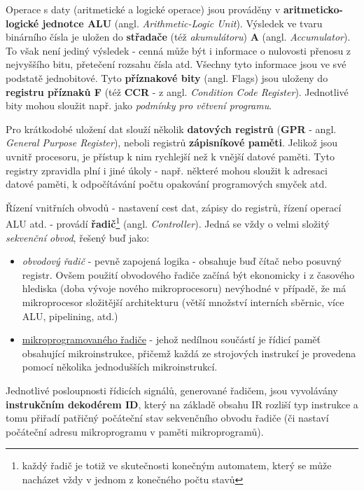     Operace s daty (aritmetické a logické operace) jsou prováděny v \textbf{aritmeticko-logické 
    jednotce ALU} (angl. \emph{Arithmetic-Logic Unit}). Výsledek ve tvaru binárního čísla je uložen 
    do \textbf{střadače} (též \emph{akumulátoru}) \textbf{A} (angl. \emph{Accumulator}). To však 
    není jediný výsledek - cenná může být i informace o nulovosti přenosu z nejvyššího bitu, 
    přetečení rozsahu čísla atd. Všechny tyto informace jsou ve své podstatě jednobitové. Tyto 
    \textbf{příznakové bity} (angl. Flags) jsou uloženy do \textbf{registru příznaků F} (též 
    \textbf{CCR} - z angl. \emph{Condition Code Register}). Jednotlivé bity mohou sloužit např. 
    jako \emph{podmínky pro větvení programu}.
    
    Pro krátkodobé uložení dat slouží několik \textbf{datových registrů} (\textbf{GPR} - angl. 
    \emph{General Purpose Register}), neboli registrů \textbf{zápisníkové paměti}. Jelikož jsou 
    uvnitř procesoru, je přístup k nim rychlejší než k vnější datové paměti. Tyto registry 
    zpravidla plní i jiné úkoly - např. některé mohou sloužit k adresaci datové paměti, k 
    odpočítávání počtu opakování programových smyček atd.
    
    Řízení vnitřních obvodů - nastavení cest dat, zápisy do registrů, řízení operací ALU atd. - 
    provádí \textbf{řadič}\footnote{každý řadič je totiž ve skutečnosti konečným automatem, který 
    se může nacházet vždy v jednom z konečného počtu stavů} (angl. \emph{Controller}). Jedná se 
    vždy o velmi složitý \emph{sekvenční 
    obvod}, řešený buď jako:
    \begin{itemize}\addtolength{\itemsep}{-0.5\baselineskip}
      \item \emph{obvodový řadič} - pevně zapojená logika - obsahuje buď čítač nebo posuvný 
           registr. Ovšem použití obvodového řadiče začíná být ekonomicky i z časového hlediska 
           (doba vývoje nového mikroprocesoru) nevýhodné v případě, že má mikroprocesor složitější 
           architekturu  (větší množství interních sběrnic, více ALU, pipelining, atd.)
      \item \hyperlink{ces:IchapIVsecIIssecI}{mikroprogramo­vaného řadiče} - jehož nedílnou 
      součástí je 
             řídicí paměť obsahující 
             mikroinstrukce, přičemž každá ze strojových instrukcí je provedena pomocí několika 
            jednodušších mikroinstrukcí.
    \end{itemize} 
   
    Jednotlivé posloupnosti řídicích signálů, generované řadičem, jsou vyvolávány 
    \textbf{instrukčním dekodérem ID}, který na základě obsahu IR rozliší typ instrukce a tomu 
    přiřadí patřičný počáteční stav sekvenčního obvodu řadiče (či nastaví počáteční adresu 
    mikroprogramu v paměti mikroprogramů).    
    
